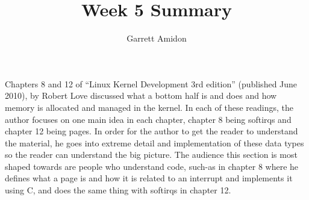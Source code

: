 \documentclass[a4paper]{article}
\title{Week 5 Summary}
\author{Garrett Amidon}
\begin{document}
\maketitle


\paragraph{}

Chapters 8 and 12 of “Linux Kernel Development 3rd edition” (published June 2010), by Robert Love discussed what a bottom half is and does and how memory is allocated and managed in the kernel. In each of these readings, the author focuses on one main idea in each chapter, chapter 8 being softirqs and chapter 12 being pages. In order for the author to get the reader to understand the material, he goes into extreme detail and implementation of these data types so the reader can understand the big picture. The audience this section is most shaped towards are people who understand code, such-as in chapter 8 where he defines what a page is and how it is related to an interrupt and implements it using C, and does the same thing with softirqs in chapter 12.
\end{document}
